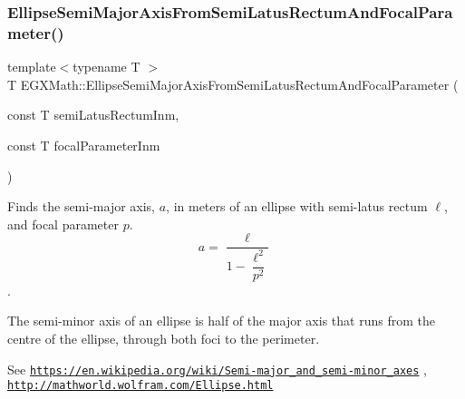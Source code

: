 \mbox{\label{group___e_g_x_math-_geometry-2_d-_ellipse-_semi_major_axis_gaea152a91fc8eb6532f497e9d25f0477c}} 
\subsubsection{\texorpdfstring{Ellipse\+Semi\+Major\+Axis\+From\+Semi\+Latus\+Rectum\+And\+Focal\+Parameter()}{EllipseSemiMajorAxisFromSemiLatusRectumAndFocalParameter()}}
{\footnotesize\ttfamily template$<$typename T $>$ \\
T E\+G\+X\+Math\+::\+Ellipse\+Semi\+Major\+Axis\+From\+Semi\+Latus\+Rectum\+And\+Focal\+Parameter (\begin{DoxyParamCaption}\item[{const T}]{semi\+Latus\+Rectum\+Inm,  }\item[{const T}]{focal\+Parameter\+Inm }\end{DoxyParamCaption})}



Finds the semi-\/major axis, $a$, in meters of an ellipse with semi-\/latus rectum $\ell$, and focal parameter $p$. \[ a=\dfrac{\ell}{1-\dfrac{\ell^2}{p^2}} \]. 

The semi-\/minor axis of an ellipse is half of the major axis that runs from the centre of the ellipse, through both foci to the perimeter.

See \href{https://en.wikipedia.org/wiki/Semi-major_and_semi-minor_axes}{\tt https\+://en.\+wikipedia.\+org/wiki/\+Semi-\/major\+\_\+and\+\_\+semi-\/minor\+\_\+axes} , \href{http://mathworld.wolfram.com/Ellipse.html}{\tt http\+://mathworld.\+wolfram.\+com/\+Ellipse.\+html}


